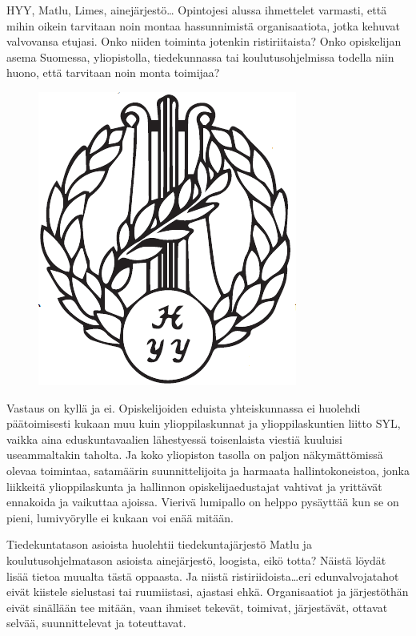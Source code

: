 \documentclass[a5paper, 8pt, twocolumn]{book} %
\numberwithin{equation}{section}
\begin{document}
HYY, Matlu, Limes, aine\-järjestö\dots
Opintojesi alussa ihmettelet varmasti,
että mihin oikein tarvitaan noin montaa
hassun\-nimistä organisaatiota, jotka kehuvat
valvovansa etujasi. Onko niiden toiminta
jotenkin ristiriitaista? Onko opiskelijan
asema Suomessa, yliopistolla, tiedekunnassa
tai koulutusohjelmissa todella niin huono, että
tarvitaan noin monta toimijaa?
\begin{figure}[h]
	\includegraphics[width=0.8\columnwidth]{hyylogo.png}
\end{figure}

Vastaus on kyllä ja ei. Opiskelijoiden
eduista yhteiskunnassa ei huolehdi päätoimisesti
kukaan muu kuin ylioppilaskunnat
ja ylioppilaskuntien liitto SYL, vaikka aina
eduskuntavaalien lähestyessä toisenlaista
viestiä kuuluisi useammaltakin taholta. Ja
koko yliopiston tasolla on paljon näkymättömissä
olevaa toimintaa, satamäärin suunnittelijoita
ja harmaata hallintokoneistoa,
jonka liikkeitä ylioppilaskunta ja hallinnon
opiskelijaedustajat vahtivat ja yrittävät ennakoida
ja vaikuttaa ajoissa. Vierivä lumipallo
on helppo pysäyttää kun se on pieni,
lumivyörylle ei kukaan voi enää mitään.

Tiedekuntatason asioista huolehtii tiedekuntajärjestö
Matlu ja koulutusohjelmatason
asioista ainejärjestö, loogista, eikö totta?
Näistä löydät lisää tietoa muualta tästä
oppaasta. Ja niistä ristiriidoista\dots eri edunvalvojatahot
eivät kiistele sielustasi tai
ruumiistasi, ajastasi ehkä. Organisaatiot ja
järjestöthän eivät sinällään tee mitään, vaan
ihmiset tekevät, toimivat, järjestävät, ottavat
selvää, suunnittelevat ja toteuttavat.
\end{document}
